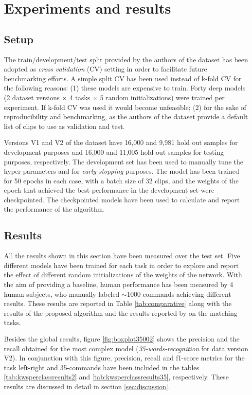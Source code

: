 \section{Experiments and results} \label{sec:results}
\subsection{Setup}
The train/development/test split provided by the authors of the dataset \autocite{speechcommands} has been adopted as \textit{cross validation} (CV) setting in order to facilitate future benchmarking efforts. A simple split CV has been used instead of k-fold CV for the following reasons: (1) these models are expensive to train. Forty deep models (2 dataset versions $\times$ 4 tasks $\times$ 5 random initializations) were trained per experiment. If k-fold CV was used it would become unfeasible; (2) for the sake of reproducibility and benchmarking, as the authors of the dataset provide a default list of clips to use as validation and test.

Versions V1 and V2 of the dataset have 16,000 and 9,981 hold out samples for development purposes and 16,000 and 11,005 hold out samples for testing purposes, respectively. The development set has been used to manually tune the hyper-parameters and for \textit{early stopping} purposes. The model has been trained for 50 epochs in each case, with a batch size of 32 clips, and the weights of the epoch that achieved the best performance in the development set were checkpointed. The checkpointed models have been used to calculate and report the performance of the algorithm.

\subsection{Results}
All the results shown in this section have been measured over the test set. Five different models have been trained for each task in order to explore and report the effect of different random initializations of the weights of the network. With the aim of providing a baseline, human performance has been measured by 4 human subjects, who manually labeled $\sim 1000$ commands achieving different results. These results are reported in Table \ref{tab:comparative} along with the results of the proposed algorithm and the results reported by \autocite{Andrade2018, Zhang2017, Mcmahan2017, Warden2018} on the matching tasks.

Besides the global results, figure \ref{fig:boxplot35002} shows the precision and the recall obtained for the most complex model (\textit{35-words-recognition} for data version V2). In conjunction with this figure, precision, recall and f1-score metrics for the task left-right and 35-commands have been included in the tables \ref{tab:kwsperclassresults2} and \ref{tab:kwsperclassresults35}, respectively. These results are discussed in detail in section \ref{sec:discussion}.

